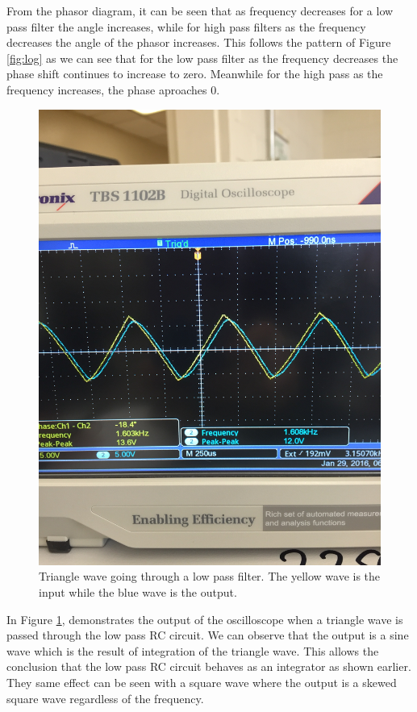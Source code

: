 \documentclass[11pt,letterpaper,onecolumn]{article}
\begin{document}
From the phasor diagram, it can be seen that as frequency decreases for a low pass filter the angle increases, while for high pass filters as the frequency decreases the angle of the phasor increases. This follows the pattern of Figure \ref{fig:log} as we can see that for the low pass filter as the frequency decreases the phase shift continues to increase to zero. Meanwhile for the high pass as the frequency increases, the phase aproaches 0. 

\begin{figure}[H]
    \centering
    \includegraphics[scale = .1,angle = 270]{image4.JPG}
    \caption{Triangle wave going through a low pass filter. The yellow wave is the input while the blue wave is the output.}
    \label{fig:TriL}
\end{figure}

In Figure \ref{fig:TriL}, demonstrates the output of the oscilloscope when a triangle wave is passed through the low pass RC circuit. We can observe that the output is a sine wave which is the result of integration of the triangle wave. This allows the conclusion that the low pass RC circuit behaves as an integrator as shown earlier. They same effect can be seen with a square wave where the output is a skewed square wave regardless of the frequency.   
\end{document}
